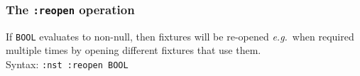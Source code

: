 \subsubsection{The \texttt{:reopen} operation}
%
If \texttt{BOOL} evaluates to non-null, then fixtures will be
re-opened \emph{e.g.}\ when required multiple times by opening
different fixtures that use them.
\\ Syntax: \texttt{:nst :reopen BOOL}

